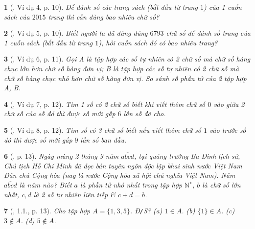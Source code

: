 \documentclass{article}
\newtheorem{baitoan}{}
\begin{document}
\begin{baitoan}[\cite{Binh_boi_duong_Toan_6_tap_1}, Ví dụ 4, p. 10]
	Để đánh số các trang sách (bắt đầu từ trang $1$) của 1 cuốn sách của $2015$ trang thì cần dùng bao nhiêu chữ số?
\end{baitoan}

\begin{baitoan}[\cite{Binh_boi_duong_Toan_6_tap_1}, Ví dụ 5, p. 10]
	Biết người ta đã dùng đúng $6793$ chữ số để đánh số trang của 1 cuốn sách (bắt đầu từ trang $1$), hỏi cuốn sách đó có bao nhiêu trang?
\end{baitoan}

\begin{baitoan}[\cite{Binh_boi_duong_Toan_6_tap_1}, Ví dụ 6, p. 11]
	Gọi A là tập hợp các số tự nhiên có 2 chữ số mà chữ số hàng chục lớn hơn chữ số hàng đơn vị; B là tập hợp các số tự nhiên có 2 chữ số mà chữ số hàng chục nhỏ hơn chữ số hàng đơn vị. So sánh số phần tử của 2 tập hợp A, B.
\end{baitoan}

\begin{baitoan}[\cite{Binh_boi_duong_Toan_6_tap_1}, Ví dụ 7, p. 12]
	Tìm 1 số có 2 chữ số biết khi viết thêm chữ số $0$ vào giữa 2 chữ số của số đó thì được số mới gấp $6$ lần số đã cho.
\end{baitoan}

\begin{baitoan}[\cite{Binh_boi_duong_Toan_6_tap_1}, Ví dụ 8, p. 12]
	Tìm số có 3 chữ số biết nếu viết thêm chữ số $1$ vào trước số đó thì được số mới gấp $9$ lần số ban đầu.	
\end{baitoan}

\begin{baitoan}[\cite{Binh_boi_duong_Toan_6_tap_1}, p. 13]
	Ngày mùng 2 tháng 9 năm $\overline{abcd}$, tại quảng trường Ba Đình lịch sử, Chủ tịch Hồ Chí Minh đã đọc bản tuyên ngôn độc lập khai sinh nước Việt Nam Dân chủ Cộng hòa (nay là nước Cộng hòa xã hội chủ nghĩa Việt Nam). Năm $\overline{abcd}$ là năm nào? Biết $a$ là phần tử nhỏ nhất trong tập hợp $ \mathbb{N}^\star$, $b$ là chữ số lớn nhất, $c,d$ là 2 số tự nhiên liên tiếp \& $c + d = b$.
\end{baitoan}

\begin{baitoan}[\cite{Binh_boi_duong_Toan_6_tap_1}, 1.1., p. 13]
	Cho tập hợp $A = \{1,3,5\}$. {\rm Đ{\tt/}S?} (a) $1\in A$. (b) $\{1\}\in A$. (c) $3\notin A$. (d) $5\notin A$.
\end{baitoan}
\end{document}
